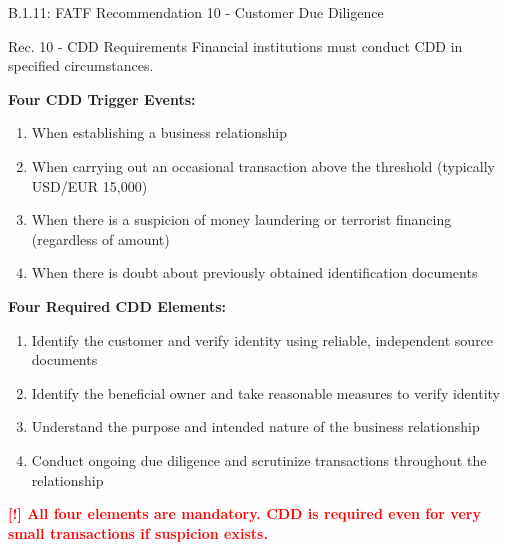 \documentclass[11pt,a4paper]{beamer}
\newcommand{\redflag}[1]{\textcolor{red}{\textbf{[!] #1}}}
\begin{document}
	\begin{frame}{B.1.11: FATF Recommendation 10 - Customer Due Diligence}
		\begin{block}{Rec. 10 - CDD Requirements}
			Financial institutions must conduct CDD in specified circumstances.
		\end{block}
		\textbf{Four CDD Trigger Events:}
		\begin{enumerate}
			\item When establishing a business relationship
			\item When carrying out an occasional transaction above the threshold (typically USD/EUR 15,000)
			\item When there is a suspicion of money laundering or terrorist financing (regardless of amount)
			\item When there is doubt about previously obtained identification documents
		\end{enumerate}
		\textbf{Four Required CDD Elements:}
		\begin{enumerate}
			\item Identify the customer and verify identity using reliable, independent source documents
			\item Identify the beneficial owner and take reasonable measures to verify identity
			\item Understand the purpose and intended nature of the business relationship
			\item Conduct ongoing due diligence and scrutinize transactions throughout the relationship
		\end{enumerate}
		\redflag{All four elements are mandatory. CDD is required even for very small transactions if suspicion exists.}
	\end{frame}
	
\end{document}
